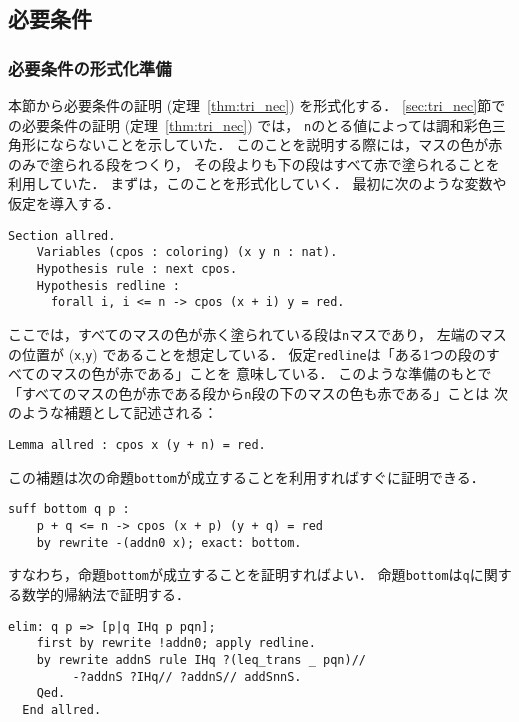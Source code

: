 

\subsection{必要条件}
\subsubsection{必要条件の形式化準備}
本節から必要条件の証明 (定理~\ref{thm:tri_nec}) を形式化する．
\ref{sec:tri_nec}節での必要条件の証明 (定理~\ref{thm:tri_nec}) では，
{\tt{n}}のとる値によっては調和彩色三角形にならないことを示していた．
このことを説明する際には，マスの色が赤のみで塗られる段をつくり，
その段よりも下の段はすべて赤で塗られることを利用していた．
まずは，このことを形式化していく．
最初に次のような変数や仮定を導入する．
\begin{lstlisting}[language=Coq]
  Section allred.
    Variables (cpos : coloring) (x y n : nat).
    Hypothesis rule : next cpos.
    Hypothesis redline :
      forall i, i <= n -> cpos (x + i) y = red.
\end{lstlisting}
ここでは，すべてのマスの色が赤く塗られている段は{\tt{n}}マスであり，
左端のマスの位置が ({\tt{x}},{\tt{y}}) であることを想定している．
仮定{\tt{redline}}は「ある1つの段のすべてのマスの色が赤である」ことを
意味している．
このような準備のもとで
「すべてのマスの色が赤である段から{\tt{n}}段の下のマスの色も赤である」ことは
次のような補題として記述される：
\begin{lstlisting}[language=Coq]
  Lemma allred : cpos x (y + n) = red.
\end{lstlisting}
この補題は次の命題{\tt{bottom}}が成立することを利用すればすぐに証明できる．
\begin{lstlisting}[language=Coq]
  suff bottom q p :
    p + q <= n -> cpos (x + p) (y + q) = red
    by rewrite -(addn0 x); exact: bottom.
\end{lstlisting}
すなわち，命題{\tt{bottom}}が成立することを証明すればよい．
命題{\tt{bottom}}は{\tt{q}}に関する数学的帰納法で証明する．
\begin{lstlisting}[language=Coq]
    elim: q p => [p|q IHq p pqn];
    first by rewrite !addn0; apply redline.
    by rewrite addnS rule IHq ?(leq_trans _ pqn)//
         -?addnS ?IHq// ?addnS// addSnnS.
    Qed.
  End allred.     
\end{lstlisting}

